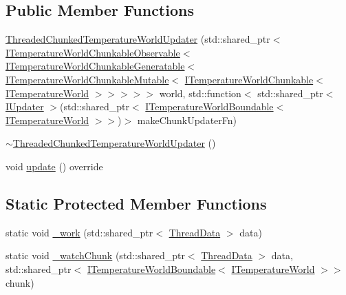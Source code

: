 \subsection*{Public Member Functions}
\begin{DoxyCompactItemize}
\item 
\hyperlink{class_threaded_chunked_temperature_world_updater_a3f009b61b2a92a9a1ff84d1bba92fe10}{Threaded\-Chunked\-Temperature\-World\-Updater} (std\-::shared\-\_\-ptr$<$ \hyperlink{class_i_temperature_world_chunkable_observable}{I\-Temperature\-World\-Chunkable\-Observable}$<$ \hyperlink{class_i_temperature_world_chunkable_generatable}{I\-Temperature\-World\-Chunkable\-Generatable}$<$ \hyperlink{class_i_temperature_world_chunkable_mutable}{I\-Temperature\-World\-Chunkable\-Mutable}$<$ \hyperlink{class_i_temperature_world_chunkable}{I\-Temperature\-World\-Chunkable}$<$ \hyperlink{class_i_temperature_world}{I\-Temperature\-World} $>$$>$$>$$>$$>$ world, std\-::function$<$ std\-::shared\-\_\-ptr$<$ \hyperlink{class_i_updater}{I\-Updater} $>$(std\-::shared\-\_\-ptr$<$ \hyperlink{class_i_temperature_world_boundable}{I\-Temperature\-World\-Boundable}$<$ \hyperlink{class_i_temperature_world}{I\-Temperature\-World} $>$$>$)$>$ make\-Chunk\-Updater\-Fn)
\item 
\hyperlink{class_threaded_chunked_temperature_world_updater_a43882f9d6af677633e51f9058d5fee16}{$\sim$\-Threaded\-Chunked\-Temperature\-World\-Updater} ()
\item 
void \hyperlink{class_threaded_chunked_temperature_world_updater_ad59106d88fbc531f52e974777a9ae34e}{update} () override
\end{DoxyCompactItemize}
\subsection*{Static Protected Member Functions}
\begin{DoxyCompactItemize}
\item 
static void \hyperlink{class_threaded_chunked_temperature_world_updater_ac3102a06273cb6767fd164ac9d89f0f3}{\-\_\-work} (std\-::shared\-\_\-ptr$<$ \hyperlink{struct_threaded_chunked_temperature_world_updater_1_1_thread_data}{Thread\-Data} $>$ data)
\item 
static void \hyperlink{class_threaded_chunked_temperature_world_updater_a955d07247e1edf94388fe775cee19cff}{\-\_\-watch\-Chunk} (std\-::shared\-\_\-ptr$<$ \hyperlink{struct_threaded_chunked_temperature_world_updater_1_1_thread_data}{Thread\-Data} $>$ data, std\-::shared\-\_\-ptr$<$ \hyperlink{class_i_temperature_world_boundable}{I\-Temperature\-World\-Boundable}$<$ \hyperlink{class_i_temperature_world}{I\-Temperature\-World} $>$$>$ chunk)
\end{DoxyCompactItemize}
